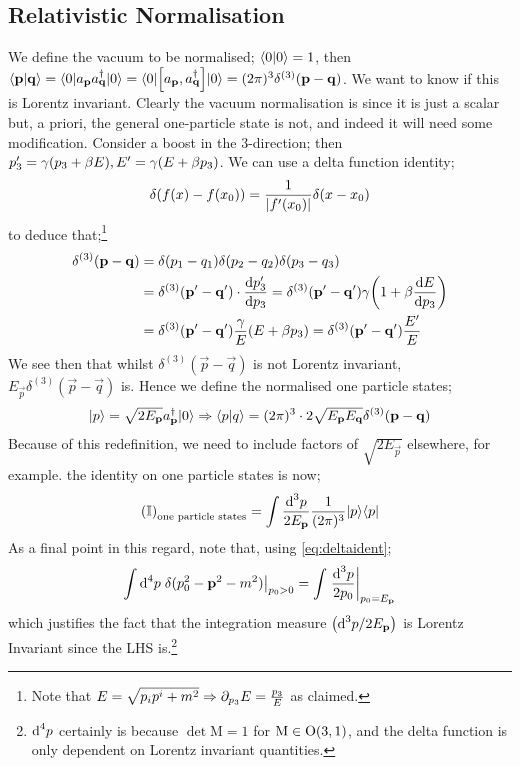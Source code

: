 \subsection{Relativistic Normalisation}
We define the vacuum to be normalised; $\braket{0}{0} = 1$, then $\braket{\vec p}{\vec q} = \expval{a_{\vec p} a_{\vec q}\dagg}{0} = \expval{\left[a_{\vec p}, a_{\vec q}\dagg\right]}{0} = (2\pi)^3 \delta^{(3)}(\vec p - \vec q)$. We want to know if this is Lorentz invariant. Clearly the vacuum normalisation is since it is just a scalar but, a priori, the general one-particle state is not, and indeed it will need some modification. Consider a boost in the $3$-direction; then $p_3^{\prime} = \gamma(p_3 + \beta E), E^{\prime} = \gamma(E + \beta p_3)$. We can use a delta function identity;
\begin{equation}
\label{eq:deltaident}
\delta\left(f(x) - f(x_0)\right) = \frac{1}{\abs{f\pr(x_0)}} \delta(x - x_0)
\end{equation}
to deduce that;\footnote{Note that $E = \sqrt{p_i p^i + m^2} \Rightarrow \partial_{p_3}E = \tfrac{p_3}{E}$ as claimed.}
\begin{align}
\delta^{(3)}(\vec p - \vec q) &= \delta(p_1 - q_1)\delta(p_2 - q_2)\delta(p_3 - q_3) \nonumber \\
&= \delta^{(3)}(\vec{p}\pr - \vec{q}\pr) \cdot \frac{\ud p_3\pr}{\ud p_3} = \delta^{(3)}(\vec{p}\pr - \vec{q}\pr) \gamma\left(1 + \beta \frac{\ud E}{\ud p_3}\right) \nonumber \\
&= \delta^{(3)}(\vec{p}\pr - \vec{q}\pr) \frac{\gamma}{E}(E + \beta p_3) = \delta^{(3)}(\vec{p}\pr - \vec{q}\pr)\frac{E\pr}{E}
\end{align}
We see then that whilst $\delta^{(3)}(\vec{p}- \vec{q})$ is not Lorentz invariant, $E_{\vec p}\delta^{(3)}(\vec{p} - \vec{q})$ is. Hence we define the normalised one particle states;
\begin{equation}
\ket{p} = \sqrt{2E_{\vec p}}a\dagg_{\vec p}\ket{0} \Rightarrow \braket{p}{q} = (2\pi)^3 \cdot 2\sqrt{E_{\vec p}E_{\vec q}} \delta^{(3)}(\vec p - \vec q)
\end{equation}
Because of this redefinition, we need to include factors of $\sqrt{2E_{\vec p}}$ elsewhere, for example. the identity on one particle states is now;
\begin{equation}
\left(\II\right)_{\text{one particle states}} = \int{\frac{\ud^3 p}{2 E_{\vec p}}\frac{1}{(2\pi)^3}\ket{p}\bra{p}}
\end{equation}
As a final point in this regard, note that, using \eqref{eq:deltaident};
\begin{equation}
\int{\upd{^4 p} \left.\delta(p_0^2 - \vec{p}^2 - m^2)\right|_{p_0 > 0}} = \int{\left.\frac{\ud^3 p}{2p_0}\right|_{p_0 = E_{\vec p}}}
\end{equation}
which justifies the fact that the integration measure $\left(\ud^3 p / 2E_{\vec p}\right)$ is Lorentz Invariant since the LHS is.\footnote{$\text{d}^4 p$ certainly is because $\det \text{M} = 1$ for $\text{M} \in \Orth{3,1}$, and the delta function is only dependent on Lorentz invariant quantities.}
